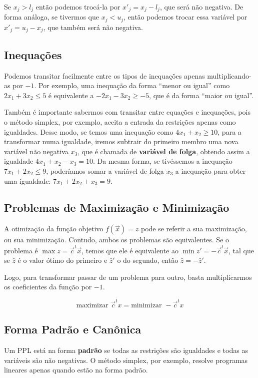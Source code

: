 Se $x_j > l_j$ então podemos trocá-la por $x'_j = x_j - l_j$, que será não negativa. De forma análoga, se tivermos que $x_j < u_j$, então podemos trocar essa variável por $x'_j = u_j - x_j$, que também será não negativa.

\subsection{Inequações}

Podemos transitar facilmente entre os tipos de inequações apenas multiplicando-as
por $-1$. Por exemplo, uma inequação da forma ``menor ou igual'' como $2x_1 + 3x_2 \leq 5$
é equivalente a $-2x_1 - 3x_2 \geq -5$, que é da forma ``maior ou igual''.

Também é importante sabermos com transitar entre equações e inequações, pois o
método simplex, por exemplo, aceita a entrada da restrições apenas como igualdades.
Desse modo, se temos uma inequação como $4x_1 + x_2 \geq 10$, para a transformar
numa igualdade, iremos subtrair do primeiro membro uma nova variável não
negativa $x_3$, que é chamada de \textbf{variável de folga}, obtendo assim a igualdade
$4x_1 + x_2 - x_3 = 10$. Da mesma forma, se tivéssemos a inequação $7x_1 + 2x_2 \leq 9$,
poderíamos somar a variável de folga $x_3$ a inequação para obter uma igualdade:
$7x_1 + 2x_2 + x_3 = 9$.

\subsection{Problemas de Maximização e Minimização}

A otimização da função objetivo $f(\vec x) = z$ pode se referir a sua maximização, ou sua minimização.
Contudo, ambos os problemas são equivalentes. Se o problema é $\max z = \vec c^t \vec x$,
temos que ele é equivalente ao $ \min z' = -\vec c^t \vec x $, tal que se $\hat{z}$
é o valor ótimo do primeiro e $\hat{z}'$ o do segundo, então $\hat{z} = -\hat{z}'$.

Logo, para transformar passar de um problema para outro, basta multiplicarmos
os coeficientes da função por $-1$.

\begin{equation*}
	\text{maximizar\ } \vec c^tx = \text{minimizar\ } -\vec c^tx
\end{equation*}

\subsection{Forma Padrão e Canônica}
Um PPL está na forma \textbf{padrão} se todas as restrições são igualdades e
todas as variáveis são não negativas. O método simplex, por exemplo, resolve
programas lineares apenas quando estão na forma padrão.

